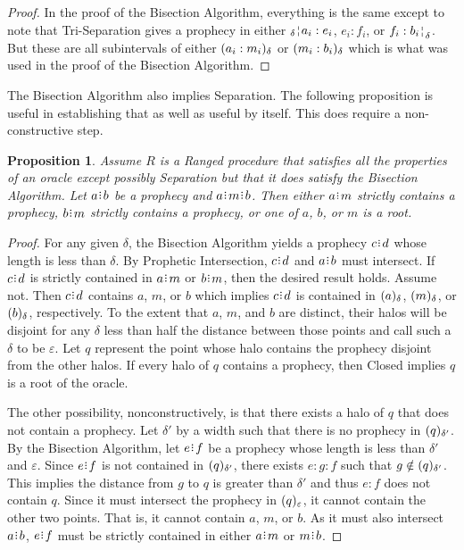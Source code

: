 \documentclass[12pt]{article}
\newtheorem{proposition}{Proposition}[section]
\begin{document}
\begin{proof}
    In the proof of the Bisection Algorithm, everything is the same except to note that Tri-Separation gives a prophecy in either $\fuzbleft{a_i}:e_i$, $e_i:f_i$, or $f_i:\fuzbright{b_i}$. But these are all subintervals of either $\halo{a_i:m_i}$ or $\halo{m_i:b_i}$ which is what was used in the proof of the Bisection Algorithm.
\end{proof}

The Bisection Algorithm also implies Separation. The following proposition is useful in establishing that as well as useful by itself. This does require a non-constructive step.

\begin{proposition}
    Assume $R$ is a Ranged procedure that satisfies all the properties of an oracle except possibly Separation but that it does satisfy the Bisection Algorithm. Let $a \rint b$ be a prophecy and $a \rint  m \rint  b$. Then either $a\rint m$ strictly contains a prophecy, $b\rint m$ strictly contains a prophecy, or one of $a$, $b$, or $m$ is a root. 
\end{proposition}

\begin{proof}
    For any given $\delta$, the Bisection Algorithm yields a prophecy $c\rint d$ whose length is less than $\delta$. By Prophetic Intersection, $c\rint d$ and $a\rint b$ must intersect. If $c\rint d$ is strictly contained in $a\rint m$ or $b\rint m$, then the desired result holds. Assume not. Then $c\rint d$ contains $a$, $m$, or $b$ which implies $c\rint d$ is contained in $\halo{a}$, $\halo{m}$, or $\halo{b}$, respectively. To the extent that $a$, $m$, and $b$ are distinct, their halos will be disjoint for any $\delta$ less than half the distance between those points and call such a $\delta$ to be $\varepsilon$. Let $q$ represent the point whose halo contains the prophecy disjoint from the other halos. If every halo of $q$ contains a prophecy, then Closed implies $q$ is a root of the oracle. 
    
    The other possibility, nonconstructively, is that there exists a halo of $q$ that does not contain a prophecy. Let $\delta'$ by a width such that there is no prophecy in $\halo[\delta']{q}$. By the Bisection Algorithm, let $e \rint f$ be a prophecy whose length is less than $\delta'$ and $\varepsilon$. Since $e \rint f$ is not contained in $\halo[\delta']{q}$, there exists $e:g:f$ such that $g \notin \halo[\delta']{q}$. This implies the distance from $g$ to $q$ is greater than $\delta'$ and thus $e:f$ does not contain $q$. Since it must intersect the prophecy in $\halo[\varepsilon]{q}$, it cannot contain the other two points. That is, it cannot contain $a$, $m$, or $b$. As it must also intersect $a \rint b$, $e \rint f$ must be strictly contained in either $a \rint m$ or $m \rint b$. 
\end{proof}
\end{document}
